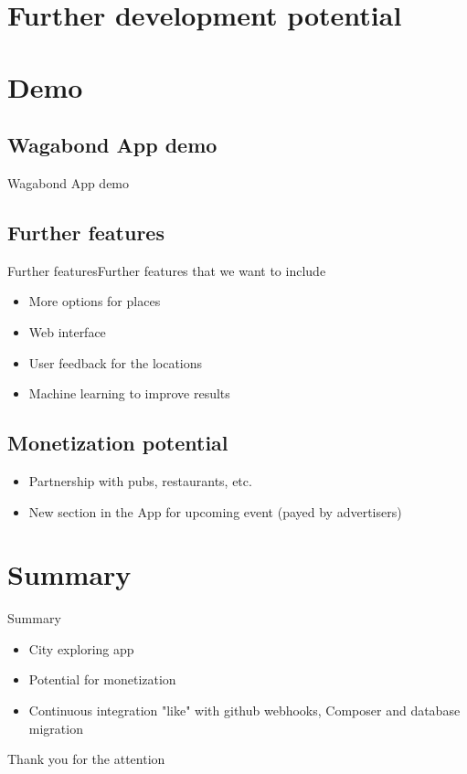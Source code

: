 \documentclass{beamer}
\begin{document}
\section{Further development potential}

\section{Demo}

\subsection{Wagabond App demo}

\begin{frame}{Wagabond App demo}
\end{frame}

\subsection{Further features}

\begin{frame}{Further features}{Further features that we want to include}
  \begin{itemize}
  \item {More options for places    
  }
  \item {Web interface   
  }
  \item {User feedback for the locations   
  }
  \item {Machine learning to improve results   
  }
  \end{itemize}
\end{frame}

\subsection{Monetization potential}

\begin{frame}{}
  \begin{itemize}
  \item {Partnership with pubs, restaurants, etc.    
  }
  \item {New section in the App for upcoming event (payed by advertisers)   
  }
  \end{itemize}
\end{frame}


\section*{Summary}

\begin{frame}{Summary}
  \begin{itemize}
  \item
    City exploring app
  \item
    Potential for monetization
  \item
    Continuous integration "like" with github webhooks, Composer and database migration
  \end{itemize}
\end{frame}

\begin{frame}{Thank you for the attention}
\end{frame}
\end{document}
